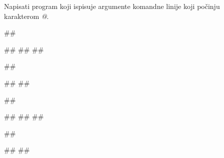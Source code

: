 \begin{Exercise}[label=p2.6_02] 
Napisati program koji ispisuje argumente komandne linije koji počinju karakterom \textit{@}.

\begin{miditest}
\begin{upotreba}{1}
##

#\naslovIzlaz#
##
##
\end{upotreba}
\end{miditest}
\begin{miditest}
\begin{upotreba}{2}
##

#\naslovIzlaz#
##
\end{upotreba}
\end{miditest}

\begin{miditest}
\begin{upotreba}{3}
##

#\naslovIzlaz#
##
##
\end{upotreba}
\end{miditest}
\begin{miditest}
\begin{upotreba}{4}
##

#\naslovIzlaz#
##
\end{upotreba}
\end{miditest}
\end{Exercise}
\ifresenja
\begin{Answer}[ref=p2.6_02]
\end{Answer}
 \fi


